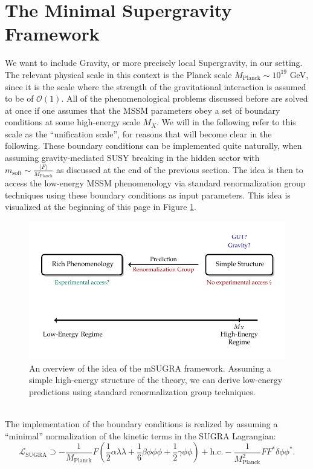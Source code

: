 \section{The Minimal Supergravity Framework}
We want to include Gravity, or more precisely local Supergravity, in our setting. The relevant physical scale in this context is the Planck scale $M_{\mathrm{Planck}}\sim 10^{19}$ GeV, since it is the scale where the strength of the gravitational interaction is assumed to be of $\mathcal{O}(1)$.
All of the phenomenological problems discussed before are solved at once if one assumes that the MSSM parameters obey a set of boundary conditions at some high-energy scale $M_X$. We will in the following refer to this scale as the \enquote{unification scale}, for reasons that will become clear in the following. These boundary conditions can be implemented quite naturally, when assuming gravity-mediated SUSY breaking in the hidden sector with $m_{\mathrm{soft}}\sim\frac{\langle F\rangle}{M_{\mathrm{Planck}}}$ as discussed at the end of the previous section. The idea is then to access the low-energy MSSM phenomenology via standard renormalization group techniques using these boundary conditions as input parameters. This idea is visualized at the beginning of this page in Figure \ref{fig:msugra}. 
\begin{figure}[t]
\centering
\includegraphics[scale = 1]{figures/mSUGRA_idea}
\caption{An overview of the idea of the mSUGRA framework. Assuming a simple high-energy structure of the theory, we can derive low-energy predictions using standard renormalization group techniques.}
\label{fig:msugra}
\end{figure}\\
\noindent The implementation of the boundary conditions is realized by assuming a \enquote{minimal} normalization of the kinetic terms in the SUGRA Lagrangian:
\begin{equation}
	\mathcal{L}_{\mathrm{SUGRA}} \supset-\frac{1}{M_{\mathrm{Planck}}} F\left(\frac{1}{2}  \alpha\lambda \lambda+\frac{1}{6}  \beta  \phi \phi \phi+\frac{1}{2} \gamma \phi \phi\right)+\mathrm{h.c.}-\frac{1}{M_{\mathrm{Planck}}^{2}} F F^{*} \delta \phi \phi^*.
\end{equation}
